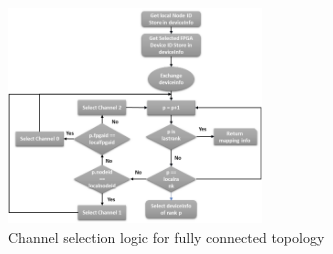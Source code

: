 \begin{figure}[h]%
    \centering
    \includegraphics[width=0.6\textwidth]{images/channel_select}
    \caption{Channel selection logic for fully connected topology}
    \label{fig:channel_select}
\end{figure}

